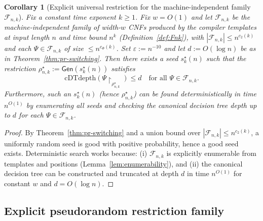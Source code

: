 \documentclass[12pt]{article}
\newtheorem{corollary}[theorem]{Corollary}
\theoremstyle{definition}
\theoremstyle{definition}
\theoremstyle{remark}
\theoremstyle{remark}
\begin{document}
\begin{corollary}[Explicit universal restriction for the machine-independent family $\mathcal{F}_{n,k}$]
\label{cor:universal-restriction}
Fix a constant time exponent $k\ge 1$. Fix $w=O(1)$ and let $\mathcal{F}_{n,k}$ be the machine-independent family of width-$w$ CNFs produced by the
compiler templates at input length $n$ and time bound $n^k$ (Definition~\ref{def:Fnk}), with $|\mathcal{F}_{n,k}|\le n^{c_2(k)}$ and each $\Psi\in \mathcal{F}_{n,k}$ of size $\le n^{c_\Phi(k)}$.
Set $\varepsilon := n^{-10}$ and let $d:=O(\log n)$ be as in Theorem~\ref{thm:pr-switching}.
Then there exists a seed $s^\star_k(n)$ such that the restriction $\rho^\star_{n,k} := \mathsf{Gen}(s^\star_k(n))$ satisfies
\[
\mathrm{cDTdepth}(\Psi\!\upharpoonright_{\rho^\star_{n,k}}) \le d
\quad\text{for all }\Psi\in \mathcal{F}_{n,k}.
\]
Furthermore, such an $s^\star_k(n)$ (hence $\rho^\star_{n,k}$) can be found deterministically in time $n^{O(1)}$
by enumerating all seeds and checking the canonical decision tree depth up to $d$ for each $\Psi\in \mathcal{F}_{n,k}$.
\end{corollary}

\begin{proof}
By Theorem~\ref{thm:pr-switching} and a union bound over $|\mathcal{F}_{n,k}|\le n^{c_2(k)}$, a uniformly random seed is good
with positive probability, hence a good seed exists. Deterministic search works because:
(i) $\mathcal{F}_{n,k}$ is explicitly enumerable from templates and positions (Lemma~\ref{lem:enumerability}), and
(ii) the canonical decision tree can be
constructed and truncated at depth $d$ in time $n^{O(1)}$ for constant $w$ and $d=O(\log n)$.
\end{proof}

\subsection{Explicit pseudorandom restriction family}
\label{subsec:prg-statement}
\end{document}
